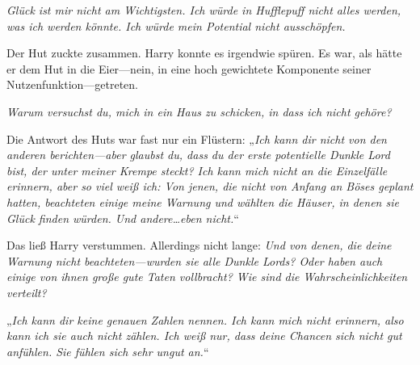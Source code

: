 \emph{Glück ist mir nicht am Wichtigsten. Ich würde in Hufflepuff nicht alles werden, was ich werden könnte. Ich würde mein Potential nicht ausschöpfen.}

Der Hut zuckte zusammen. Harry konnte es irgendwie spüren. Es war, als hätte er dem Hut in die Eier—nein, in eine hoch gewichtete Komponente seiner Nutzenfunktion—getreten.

\emph{Warum versuchst du, mich in ein Haus zu schicken, in dass ich nicht gehöre?}

Die Antwort des Huts war fast nur ein Flüstern: „\emph{Ich kann dir nicht von den anderen berichten—aber glaubst du, dass du der erste potentielle Dunkle Lord bist, der unter meiner Krempe steckt? Ich kann mich nicht an die Einzelfälle erinnern, aber so viel weiß ich: Von jenen, die nicht von Anfang an Böses geplant hatten, beachteten einige meine Warnung und wählten die Häuser, in denen sie Glück finden würden. Und andere…eben nicht.}“

Das ließ Harry verstummen. Allerdings nicht lange: \emph{Und von denen, die deine Warnung \emph{nicht} beachteten—wurden sie \emph{alle} Dunkle Lords? Oder haben auch einige von ihnen große gute Taten vollbracht? Wie sind die Wahrscheinlichkeiten verteilt? }

„\emph{Ich kann dir keine genauen Zahlen nennen. Ich kann mich nicht erinnern, also kann ich sie auch nicht zählen. Ich weiß nur, dass deine Chancen sich nicht gut anfühlen. Sie fühlen sich \emph{sehr} ungut an.}“

